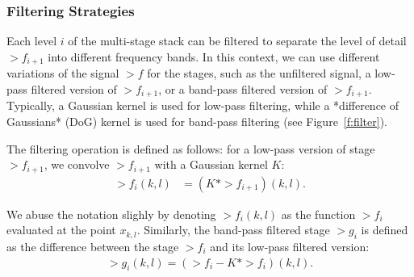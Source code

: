 \subsubsection{Filtering Strategies}

Each level $i$ of the multi-stage stack can be filtered to separate the level of detail $\gt{f}_{i+1}$ into different frequency bands. In this context, we can use different variations of the signal \(\gt{f}\) for the stages, such as the unfiltered signal, a low-pass filtered version of \(\gt{f}_{i+1}\), or a band-pass filtered version of \(\gt{f}_{i+1}\). Typically, a Gaussian kernel is used for low-pass filtering, while a *difference of Gaussians* (DoG) kernel is used for band-pass filtering (see Figure~\ref{f:filter}).

The filtering operation is defined as follows: for a low-pass version of stage \(\gt{f}_{i+1}\), we convolve \(\gt{f}_{i+1}\) with a Gaussian kernel \( K \):
\begin{align}\label{e-gaussian-filter}
    \gt{f}_i(k,l) &= \left( K * \gt{f}_{i+1} \right)(k, l).
\end{align}

We abuse the notation slighly by denoting $\gt{f}_i(k,l)$ as the function $\gt{f}_i$ evaluated at the point $x_{k,l}$.
Similarly, the band-pass filtered stage \(\gt{g}_i\) is defined as the difference between the stage \(\gt{f}_i\) and its low-pass filtered version:
\begin{align}
    \gt{g}_i(k,l) = \left( \gt{f}_{i} - K * \gt{f}_{i} \right)(k, l).
\end{align}




